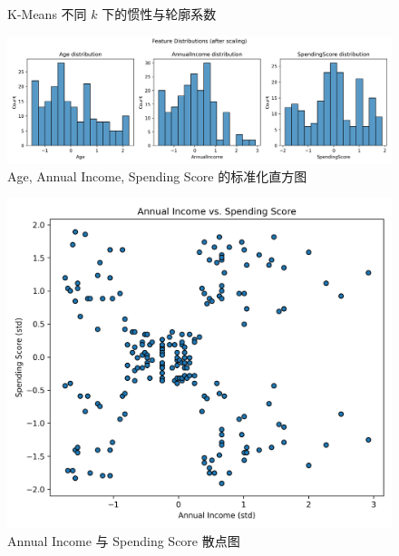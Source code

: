 \documentclass[UTF8]{ctexart}
\begin{document}
\begin{figure}[htbp]
    \centering
    \hfill
    \caption{K-Means 不同 \(k\) 下的惯性与轮廓系数}
    \label{fig:elbow_silhouette}
\end{figure}

\begin{figure}[htbp]
    \centering
    \includegraphics[width=\linewidth]{figures2/feature_hist.png}
    \caption{Age, Annual Income, Spending Score 的标准化直方图}
    \label{fig:feature_hist}
\end{figure}

\begin{figure}[htbp]
    \centering
    \includegraphics[width=0.6\linewidth]{figures2/income_vs_score.png}
    \caption{Annual Income 与 Spending Score 散点图}
    \label{fig:income_vs_score}
\end{figure}
\end{document}
